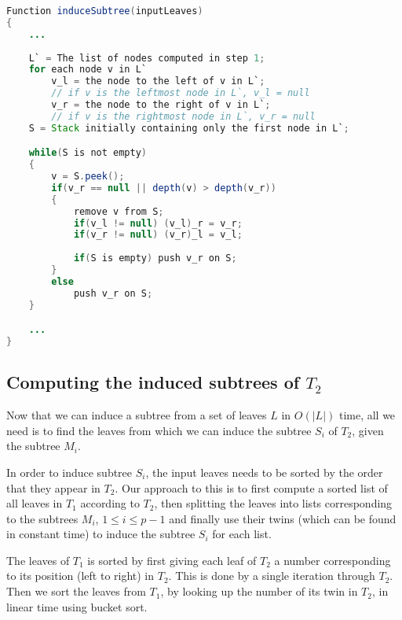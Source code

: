 \begin{lstlisting}[language=Java, caption=Step 2 of induceSubtree, label={lst:induceSubtreeCode}]
Function induceSubtree(inputLeaves)
{
	...
	
	L` = The list of nodes computed in step 1;
	for each node v in L`
		v_l = the node to the left of v in L`;
		// if v is the leftmost node in L`, v_l = null
		v_r = the node to the right of v in L`;
		// if v is the rightmost node in L`, v_r = null
	S = Stack initially containing only the first node in L`;

	while(S is not empty)
	{
		v = S.peek();
		if(v_r == null || depth(v) > depth(v_r))
		{
			remove v from S;
			if(v_l != null) (v_l)_r = v_r;
			if(v_r != null) (v_r)_l = v_l;
			
			if(S is empty) push v_r on S;
		}
		else
			push v_r on S;
	}

	...
}
\end{lstlisting}

\subsection{Computing the induced subtrees of $T_2$}
Now that we can induce a subtree from a set of leaves $L$ in $O(|L|)$ time, all we need is to find the leaves from which we can induce the subtree $S_i$ of $T_2$, given the subtree $M_i$.

In order to induce subtree $S_i$, the input leaves needs to be sorted by the order that they appear in $T_2$. Our approach to this is to first compute a sorted list of all leaves in $T_1$ according to $T_2$, then splitting the leaves into lists corresponding to the subtrees $M_i$, $1 \le i \le p-1$ and finally use their twins (which can be found in constant time) to induce the subtree $S_i$ for each list.

The leaves of $T_1$ is sorted by first giving each leaf of $T_2$ a number corresponding to its position (left to right) in $T_2$. This is done by a single iteration through $T_2$. Then we sort the leaves from $T_1$, by looking up the number of its twin in $T_2$, in linear time using bucket sort.


